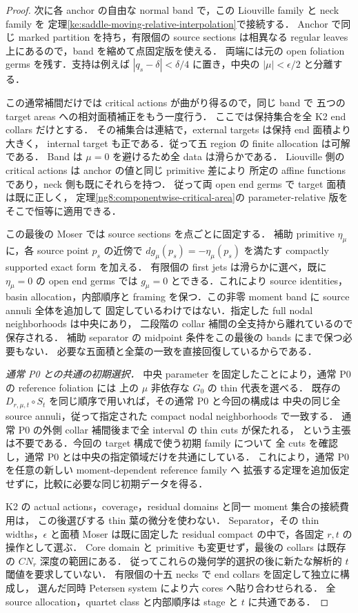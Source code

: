 \begin{proof}
次に各 anchor の自由な normal band で，この Liouville family と neck family を
定理\ref{ke:saddle-moving-relative-interpolation}で接続する．
Anchor で同じ marked partition を持ち，有限個の source sections は相異なる
regular leaves 上にあるので，band を縮めて点固定版を使える．
両端には元の open foliation germs を残す．支持は例えば
$|q_s-\delta|<\delta/4$ に置き，中央の $|\mu|<\epsilon/2$ と分離する．

この通常補間だけでは critical actions が曲がり得るので，同じ band で
五つの target areas への相対面積補正をもう一度行う．
ここでは保持集合を全 K2 end collars だけとする．
その補集合は連結で，external targets は保持 end 面積より大きく，
internal target も正である．従って五 region の finite allocation は可解である．
Band は $\mu=0$ を避けるため全 data は滑らかである．
Liouville 側の critical actions は anchor の値と同じ primitive 差により
所定の affine functions であり，neck 側も既にそれらを持つ．
従って両 open end germs で target 面積は既に正しく，
定理\ref{ng8:componentwise-critical-area}の parameter-relative 版を
そこで恒等に適用できる．

この最後の Moser では source sections を点ごとに固定する．
補助 primitive $\eta_\mu$ に，各 source point $p_s$ の近傍で
$dg_\mu(p_s)=-\eta_\mu(p_s)$ を満たす compactly supported exact form を加える．
有限個の first jets は滑らかに選べ，既に $\eta_\mu=0$ の open end germs では
$g_\mu=0$ とできる．これにより source identities，basin allocation，内部順序と
framing を保つ．この非零 moment band に source annuli 全体を追加して
固定しているわけではない．指定した full nodal neighborhoods は中央にあり，
二段階の collar 補間の全支持から離れているので保存される．
補助 separator の midpoint 条件をこの最後の bands にまで保つ必要もない．
必要な五面積と全葉の一致を直接回復しているからである．

\emph{通常 P0 との共通の初期選択．}
中央 parameter を固定したことにより，通常 P0 の reference foliation には
上の $\mu$ 非依存な $G_0$ の thin 代表を選べる．
既存の $D_{r,\mu,t}\circ S_t$ を同じ順序で用いれば，その通常 P0 と今回の構成は
中央の同じ全 source annuli，従って指定された compact nodal neighborhoods で一致する．
通常 P0 の外側 collar 補間後まで全 interval の thin cuts が保たれる，
という主張は不要である．今回の target 構成で使う初期 family について
全 cuts を確認し，通常 P0 とは中央の指定領域だけを共通にしている．
これにより，通常 P0 を任意の新しい moment-dependent reference family へ
拡張する定理を追加仮定せずに，比較に必要な同じ初期データを得る．

K2 の actual actions，coverage，residual domains と同一 moment 集合の接続費用は，
この後選びする thin 葉の微分を使わない．
Separator，その thin widths，$\epsilon$ と面積 Moser は既に固定した residual compact
の中で，各固定 $r,t$ の操作として選ぶ．
Core domain と primitive も変更せず，最後の collars は既存の $CN_r$ 深度の範囲にある．
従ってこれらの幾何学的選択の後に新たな解析的 $t$ 閾値を要求していない．
有限個の十五 necks で end collars を固定して独立に構成し，
選んだ同時 Petersen system により六 cores へ貼り合わせられる．
全 source allocation，quartet class と内部順序は stage と $t$ に共通である．
\end{proof}

